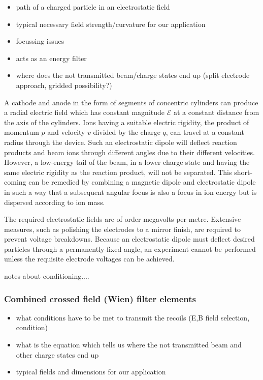\small
\begin{itemize}
\item path of a charged particle in an electrostatic field
\item typical necessary field strength/curvature for our application
\item focussing issues
\item acts as an energy filter
\item where does the not transmitted beam/charge states end up (split electrode approach, gridded possibility?)
\end{itemize}
\normalsize

A cathode and anode in the form of segments of concentric cylinders can produce a radial electric field which has constant magnitude $\mathcal{E}$  at a constant distance from the axis of the cylinders.   Ions having a suitable electric rigidity, the product of momentum $p$ and velocity $v$ divided by the charge $q$, can travel at a constant radius through the device.   Such an electrostatic dipole will deflect reaction products and beam ions through different angles due to their different velocities.  However, a low-energy tail of the beam, in a lower charge state and having the same electric rigidity as the reaction product, will not be separated.   This short-coming can be remedied by combining a magnetic dipole and electrostatic dipole in such a way that a subsequent angular focus is also a focus in ion energy but is dispersed according to ion mass.  

The required electrostatic fields are of order megavolts per metre.   Extensive measures, such as polishing the electrodes to a mirror finish, are required to prevent voltage breakdowns.   Because an electrostatic dipole must deflect desired particles through a permanently-fixed angle,  an experiment  cannot be performed unless the requisite   electrode voltages can be achieved.

notes about conditioning....

\subsubsection{Combined crossed field (Wien) filter elements}

\small
\begin{itemize}
\item what conditions have to be met to transmit the recoils (E,B field selection, condition)
\item what is the equation which tells us where the not transmitted beam and other charge states end up
\item typical fields and dimensions for our application
\end{itemize}
\normalsize

